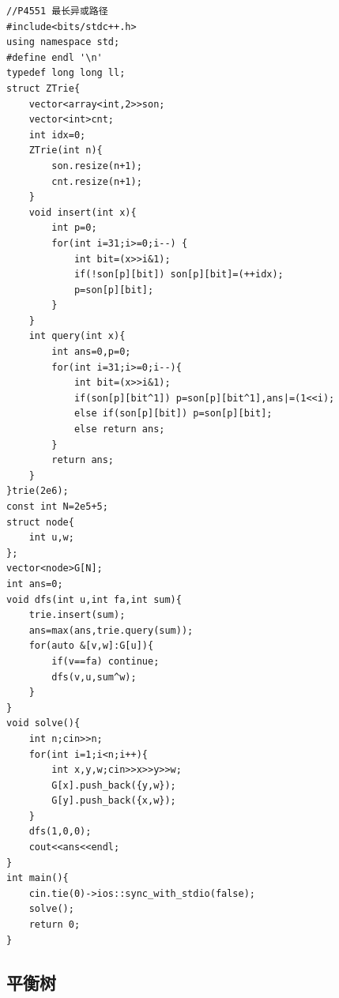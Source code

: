 \documentclass[11pt,a4paper,twocolumn]{ctexart}  %
\begin{document}
\begin{lstlisting}[caption={01-Trie},label={lst:01-Trie}]
//P4551 最长异或路径
#include<bits/stdc++.h>
using namespace std;
#define endl '\n'
typedef long long ll;
struct ZTrie{
    vector<array<int,2>>son;
    vector<int>cnt;
    int idx=0;
    ZTrie(int n){
        son.resize(n+1);
        cnt.resize(n+1);
    }
    void insert(int x){
        int p=0;
        for(int i=31;i>=0;i--) {
            int bit=(x>>i&1);
            if(!son[p][bit]) son[p][bit]=(++idx);
            p=son[p][bit];
        }
    }
    int query(int x){
        int ans=0,p=0;
        for(int i=31;i>=0;i--){
            int bit=(x>>i&1);
            if(son[p][bit^1]) p=son[p][bit^1],ans|=(1<<i);
            else if(son[p][bit]) p=son[p][bit];
            else return ans;
        }
        return ans;
    }
}trie(2e6);
const int N=2e5+5;
struct node{
    int u,w;
};
vector<node>G[N];
int ans=0;
void dfs(int u,int fa,int sum){
    trie.insert(sum);
    ans=max(ans,trie.query(sum));
    for(auto &[v,w]:G[u]){
        if(v==fa) continue;
        dfs(v,u,sum^w);
    }
}
void solve(){
    int n;cin>>n;
    for(int i=1;i<n;i++){
        int x,y,w;cin>>x>>y>>w;
        G[x].push_back({y,w});
        G[y].push_back({x,w});
    }
    dfs(1,0,0);
    cout<<ans<<endl;
}
int main(){
    cin.tie(0)->ios::sync_with_stdio(false);
    solve();
    return 0;
}
\end{lstlisting}


\subsection{平衡树}
\end{document}
